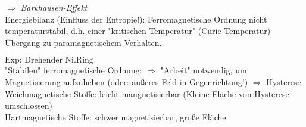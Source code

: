 \bild
$ \Rightarrow $ \emph{Barkhausen-Effekt} \\ \break
Energiebilanz (Einfluss der Entropie!): Ferromagnetische Ordnung nicht temperaturstabil, d.h. einer "kritischen Temperatur" (Curie-Temperatur) Übergang zu paramagnetischem Verhalten.\\ \break

$ \boxed{\text{Exp: Drehender Ni.Ring}} $ \\
"Stabilen" ferromagnetische Ordnung:
$ \Rightarrow $ "Arbeit" notwendig, um Magnetisierung aufzuheben (oder: äußeres Feld in Gegenrichtung!)
\bild
$ \Rightarrow $ Hysterese \\
Weichmagnetische Stoffe: leicht mangnetisierbar (Kleine Fläche von Hysterese umschlossen)\\
Hartmagnetische Stoffe: schwer magnetisierbar, große Fläche\\
